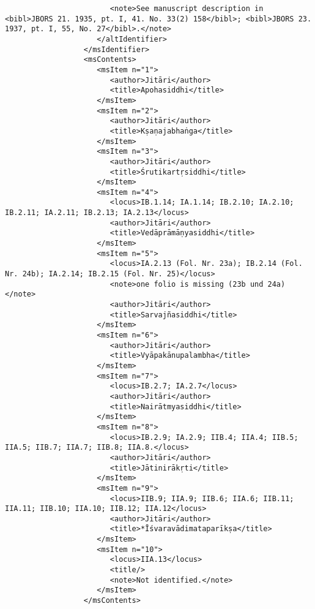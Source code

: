 \documentclass[article,12pt,a4paper]{memoir}%
\begin{document}
\begin{verbatim}
                        <note>See manuscript description in <bibl>JBORS 21. 1935, pt. I, 41. No. 33(2) 158</bibl>; <bibl>JBORS 23. 1937, pt. I, 55, No. 27</bibl>.</note>
                     </altIdentifier>
                  </msIdentifier>
                  <msContents>
                     <msItem n="1">
                        <author>Jitāri</author>
                        <title>Apohasiddhi</title>
                     </msItem>
                     <msItem n="2">
                        <author>Jitāri</author>
                        <title>Kṣaṇajabhaṅga</title>
                     </msItem>
                     <msItem n="3">
                        <author>Jitāri</author>
                        <title>Śrutikartṛsiddhi</title>
                     </msItem>
                     <msItem n="4">
                        <locus>IB.1.14; IA.1.14; IB.2.10; IA.2.10; IB.2.11; IA.2.11; IB.2.13; IA.2.13</locus>
                        <author>Jitāri</author>
                        <title>Vedāprāmāṇyasiddhi</title>
                     </msItem>
                     <msItem n="5">
                        <locus>IA.2.13 (Fol. Nr. 23a); IB.2.14 (Fol. Nr. 24b); IA.2.14; IB.2.15 (Fol. Nr. 25)</locus>
                        <note>one folio is missing (23b und 24a)</note>
                        <author>Jitāri</author>
                        <title>Sarvajñasiddhi</title>
                     </msItem>
                     <msItem n="6">
                        <author>Jitāri</author>
                        <title>Vyāpakānupalambha</title>
                     </msItem>
                     <msItem n="7">
                        <locus>IB.2.7; IA.2.7</locus>
                        <author>Jitāri</author>
                        <title>Nairātmyasiddhi</title>
                     </msItem>
                     <msItem n="8">
                        <locus>IB.2.9; IA.2.9; IIB.4; IIA.4; IIB.5; IIA.5; IIB.7; IIA.7; IIB.8; IIA.8.</locus>
                        <author>Jitāri</author>
                        <title>Jātinirākṛti</title>
                     </msItem>
                     <msItem n="9">
                        <locus>IIB.9; IIA.9; IIB.6; IIA.6; IIB.11; IIA.11; IIB.10; IIA.10; IIB.12; IIA.12</locus>
                        <author>Jitāri</author>
                        <title>*Īśvaravādimataparīkṣa</title>
                     </msItem>
                     <msItem n="10">
                        <locus>IIA.13</locus>
                        <title/>
                        <note>Not identified.</note>
                     </msItem>
                  </msContents>

\end{verbatim}
\end{document}
